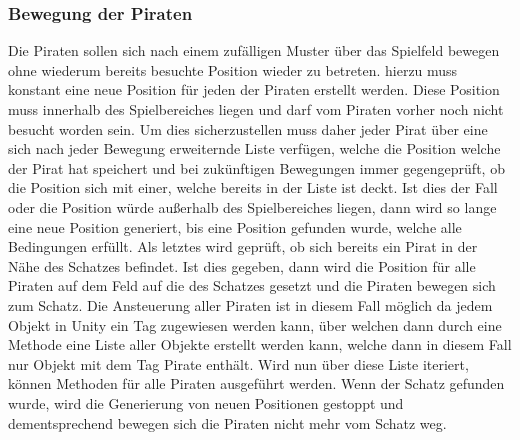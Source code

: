 \documentclass[
	12pt, %
	a4paper,
	listof=totoc, %
	bibliography=totoc, %
	numbers=noenddot, %
	ngerman, %
	headsepline, %
	oneside %
	]{scrbook} %
\begin{document}
{\subsubsection{Bewegung der Piraten}
Die Piraten sollen sich nach einem zufälligen Muster über das Spielfeld bewegen ohne wiederum bereits besuchte Position wieder zu betreten. hierzu muss konstant eine neue Position für jeden der Piraten erstellt werden. Diese Position muss innerhalb des Spielbereiches liegen und darf vom Piraten vorher noch nicht besucht worden sein. Um dies sicherzustellen muss daher jeder Pirat über eine sich nach jeder Bewegung erweiternde Liste verfügen, welche die Position welche der Pirat hat speichert und bei zukünftigen Bewegungen immer gegengeprüft, ob die Position sich mit einer, welche bereits in der Liste ist deckt. Ist dies der Fall oder die Position würde außerhalb des Spielbereiches liegen, dann wird so lange eine neue Position generiert, bis eine Position gefunden wurde, welche alle Bedingungen erfüllt. Als letztes wird geprüft, ob sich bereits ein Pirat in der Nähe des Schatzes befindet. Ist dies gegeben, dann wird die Position für alle Piraten auf dem Feld auf die des Schatzes gesetzt und die Piraten bewegen sich zum Schatz. Die Ansteuerung aller Piraten ist in diesem Fall möglich da jedem Objekt in Unity ein Tag zugewiesen werden kann, über welchen dann durch eine Methode eine Liste aller Objekte erstellt werden kann, welche dann in diesem Fall nur Objekt mit dem Tag Pirate enthält. Wird nun über diese Liste iteriert, können Methoden für alle Piraten ausgeführt werden. Wenn der Schatz gefunden wurde, wird die Generierung von neuen Positionen gestoppt und dementsprechend bewegen sich die Piraten nicht mehr vom Schatz weg. 

}
\end{document}
